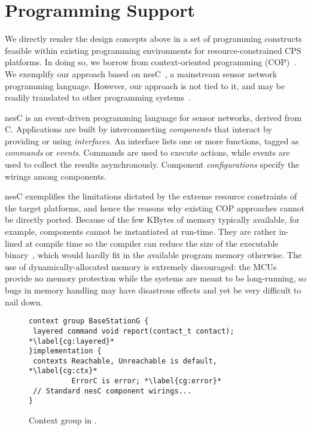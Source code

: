 \section{Programming Support}
\label{sec:conesc}

We directly render the design concepts above in a set of programming
constructs feasible within existing programming environments for
resource-constrained CPS platforms. In doing so, we borrow from
context-oriented programming (COP)~\cite{}. We exemplify our approach
based on nesC~\cite{}, a mainstream sensor network programming
language. However, our approach is not tied to it, and may be readily
translated to other programming systems~\cite{programmingsurvey}.

 nesC is an event-driven programming language
for sensor networks, derived from C. Applications are built by
interconnecting \emph{components} that interact by providing or using
\emph{interfaces}. An interface lists one or more functions, tagged as
\emph{commands} or \emph{events}. Commands are used to execute
actions, while events are used to collect the results
asynchronously. %
Component \emph{configurations} specify the wirings among
components. %

nesC exemplifies the limitations dictated by the extreme resource
constraints of the target platforms, and hence the reasons why
existing COP approaches cannot be directly ported. Because of the few
KBytes of memory typically available, for example, components cannot
be instantiated at run-time. They are rather in-lined at compile time
so the compiler can reduce the size of the executable
binary~\cite{nesc}, which would hardly fit in the available program
memory otherwise. The use of dynamically-allocated memory is extremely
discouraged: the MCUs provide no memory protection while the systems
are meant to be long-running, so bugs in memory handling may have
disastrous effects and yet be very difficult to nail down.


\begin{figure}[!tb]
\begin{lstlisting}[style=conescframe]
context group BaseStationG {
 layered command void report(contact_t contact); *\label{cg:layered}*
}implementation {
 contexts Reachable, Unreachable is default, *\label{cg:ctx}* 
          ErrorC is error; *\label{cg:error}*
 // Standard nesC component wirings...
}
\end{lstlisting}
\vspace{-4mm}
\caption{Context group in \conesc.}
  \label{fig:configuration}
\vspace{-2mm}
\end{figure}

